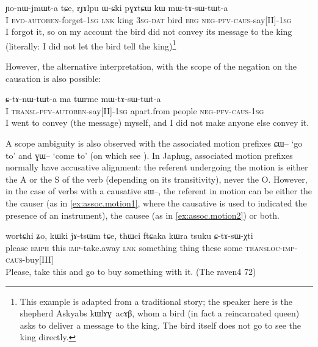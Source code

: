 \documentclass[oldfontcommands,oneside,a4paper,11pt]{article}
\newcommand{\ipa}[1]{{\phon \mbox{#1}}} %
\newcommand{\sg}{\textsc{sg}}
\newcommand{\wav}[1]{}%
\newcommand{\pfv}{\textsc{pfv}}
\newcommand{\auto}{\textsc{autoben}}
\newcommand{\caus}{\textsc{caus}}
\newcommand{\lnk}{\textsc{lnk}}
\newcommand{\dat}{\textsc{dat}}
\newcommand{\erg}{\textsc{erg}}
\newcommand{\negat}{\textsc{neg}}
\newcommand{\transloc}{\textsc{transl}}
\begin{document}
\begin{exe}
\ex
\gll  \ipa{aʑo} 	\ipa{ɲo-nɯ-jmɯt-a} 	\ipa{tɕe,} 	\ipa{rɟɤlpu} 	\ipa{ɯ-ɕki} 	\ipa{pɣɤtɕɯ} 	\ipa{kɯ} 	\ipa{mɯ-tɤ-sɯ-tɯt-a}   \\
 I \textsc{evd}-\auto{}-forget-1\sg{} \lnk{} king 3\sg{}-\dat{} bird \erg{} \negat{}-\pfv{}-\caus{}-say[II]-1\sg{} \\
  
  \glt  I forgot it, so  on my account  the bird did not convey its message to the king (literally: I did not let the bird tell the king)\footnote{This example is adapted from a traditional story; the speaker here is the shepherd Askyabs \ipa{kɯlɤɣ acɤβ}, whom a bird (in fact a reincarnated queen) asks to deliver a message to the king. The bird itself does not go to see the king directly.  } \wav{8_mWtAsWtWta2}
  \end{exe} 

  However, the alternative interpretation, with the scope of the negation on the causation is also possible:

  \begin{exe}
\ex
\gll \ipa{aʑo} 	\ipa{ɕ-tɤ-nɯ-tɯt-a} 	\ipa{ma} 	\ipa{tɯrme} 	\ipa{mɯ-tɤ-sɯ-tɯt-a} \\
I \transloc{}-\pfv{}-\auto{}-say[II]-1\sg{} apart.from people \negat{}-\pfv{}-\caus{}-1\sg{} \\
  \glt    I went to convey (the message) myself,  and I did not make anyone else convey it. \wav{8_mWtAsWtWta}
  \end{exe} 
 
A scope ambiguity is also observed with the associated motion prefixes \ipa{ɕɯ--} `go to' and  \ipa{ɣɯ--} `come to' (on which see \citealt{jacques13harmonization}). In Japhug, associated motion prefixes normally have accusative alignment: the referent undergoing the motion is either the A or the S of the verb (depending on its transitivity), never the O. However, in the case of verbs with a causative \ipa{sɯ--}, the referent in motion can be either the  the causer (as in \ref{ex:assoc.motion1}, where the causative is used to indicated the presence of an instrument), the causee (as in \ref{ex:assoc.motion2}) or both.


  \begin{exe}
\ex \label{ex:assoc.motion1}
\gll
\ipa{wortɕhi} 	\ipa{ʑo,} 	\ipa{kɯki} 	\ipa{jɤ-tsɯm} 	\ipa{tɕe,} 	\ipa{thɯci} 	\ipa{ftɕaka} 	\ipa{kɯra} 	\ipa{tsuku} 	\ipa{ɕ-tɤ-sɯ-χti} \\
please \textsc{emph} this \textsc{imp}-take.away \textsc{lnk} something thing these some \textsc{transloc-imp-caus}-buy[III] \\
\glt Please, take this and go to buy something with it. (The raven4 72)
  \end{exe} 
\end{document}
